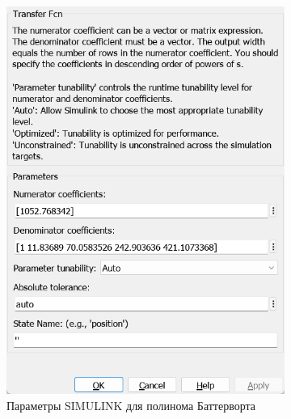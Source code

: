 \documentclass[a4paper, 12pt]{article}
\begin{document}
    \begin{figure}[H]
        \centering
        \begin{subfigure}{0.3\textwidth}
            \centering
            \includegraphics[width=\linewidth]{task1_baterwort_window.png}
            \caption{Параметры SIMULINK для полинома Баттерворта}
            \label{fig:t1bw}
        \end{subfigure}
        \begin{subfigure}{0.3\textwidth}
            \centering

\end{subfigure}
\end{figure}
\end{document}
